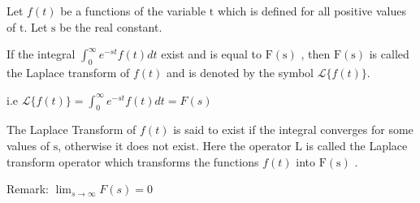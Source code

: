         Let $f(t)$ be a functions of the variable $\mathrm{t}$ which is defined for all positive values of $\mathrm{t}$.         
        Let $\mathrm{s}$ be the real constant.        
        
        If the integral $\displaystyle \int_{0}^{\infty}e^{-st}f(t)dt$ exist and is equal to $\mathrm{F}(\mathrm{s})$ , then $\mathrm{F}(\mathrm{s})$ is called the Laplace transform of $f(t)$ and is denoted by the symbol $\mathcal{L}\{f(t)\}$.

        \begin{center}
        i.e $\mathcal{L}\{f(t)\}=\displaystyle \int_{0}^{\infty}e^{-st}f(t)dt=F(s)$
        \end{center}

        The Laplace Transform of $f(t)$ is said to exist if the integral converges for some values of $\mathrm{s}$, otherwise it does not exist.
        Here the operator $\mathrm{L}$ is called the Laplace transform operator which transforms the functions $f(t)$ into $\mathrm{F}(\mathrm{s})$ .

        \begin{center}
            Remark: $\displaystyle \lim_{s \to \infty} F(s)=0$
        \end{center}
        
